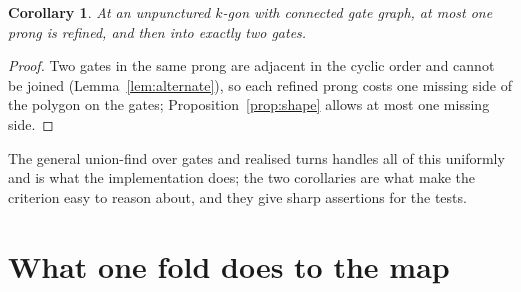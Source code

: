 \documentclass[12pt]{amsart}
\theoremstyle{plain}
\newtheorem{Corollary}[Theorem]{Corollary}
\theoremstyle{definition}
\begin{document}
\begin{Corollary}
  \label{cor:unpunctured}
  At an unpunctured $k$-gon with connected gate graph, at most one prong
  is refined, and then into exactly two gates.
\end{Corollary}
\begin{proof}
  Two gates in the same prong are adjacent in the cyclic order and cannot
  be joined (Lemma~\ref{lem:alternate}), so each refined prong costs one
  missing side of the polygon on the gates; Proposition~\ref{prop:shape}
  allows at most one missing side.
\end{proof}

The general union-find over gates and realised turns handles all of this
uniformly and is what the implementation does; the two corollaries are
what make the criterion easy to reason about, and they give sharp
assertions for the tests.

\section{What one fold does to the map}
\label{sec:fold}
\end{document}

